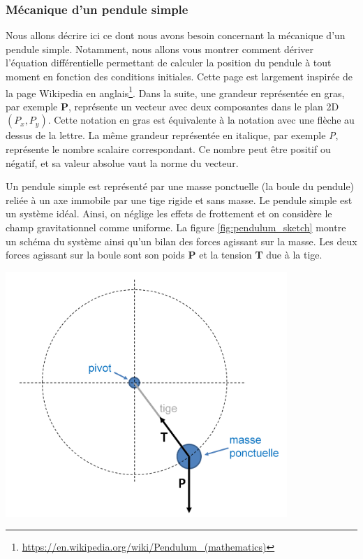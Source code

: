 \documentclass[a4paper,11pt,twoside]{book}
\renewcommand{\href}[2]{#2\footnote{\url{#1}}}
\let\origfigure=\figure
\let\endorigfigure=\endfigure
\renewenvironment{figure}[1][]{%
   \origfigure[!htbp]
}{%
   \endorigfigure
}
\begin{document}
\subsubsection{Mécanique d'un pendule
simple}\label{muxe9canique-dun-pendule-simple}

Nous allons décrire ici ce dont nous avons besoin concernant la
mécanique d'un pendule simple. Notamment, nous allons vous montrer
comment dériver l'équation différentielle permettant de calculer la
position du pendule à tout moment en fonction des conditions initiales.
Cette page est largement inspirée de la
\href{https://en.wikipedia.org/wiki/Pendulum_(mathematics)}{page
Wikipedia en anglais}. Dans la suite, une grandeur représentée en gras,
par exemple \textbf{P}, représente un vecteur avec deux composantes dans
le plan 2D \((P_{x}, P_{y})\). Cette notation en gras est équivalente à
la notation avec une flèche au dessus de la lettre. La même grandeur
représentée en italique, par exemple \emph{P}, représente le nombre
scalaire correspondant. Ce nombre peut être positif ou négatif, et sa
valeur absolue vaut la norme du vecteur.

Un pendule simple est représenté par une masse ponctuelle (la boule du
pendule) reliée à un axe immobile par une tige rigide et sans masse. Le
pendule simple est un système idéal. Ainsi, on néglige les effets de
frottement et on considère le champ gravitationnel comme uniforme. La
figure \ref{fig:pendulum_sketch} montre un schéma du système ainsi qu'un
bilan des forces agissant sur la masse. Les deux forces agissant sur la
boule sont son poids \textbf{P} et la tension \textbf{T} due à la tige.

\begin{figure}[htbp]
\centering
\includegraphics[width=0.80000\textwidth]{img/pendulum_sketch.png}
\caption{Bilan des forces dans un pendule
simple.\label{fig:pendulum_sketch}}
\end{figure}
\end{document}
